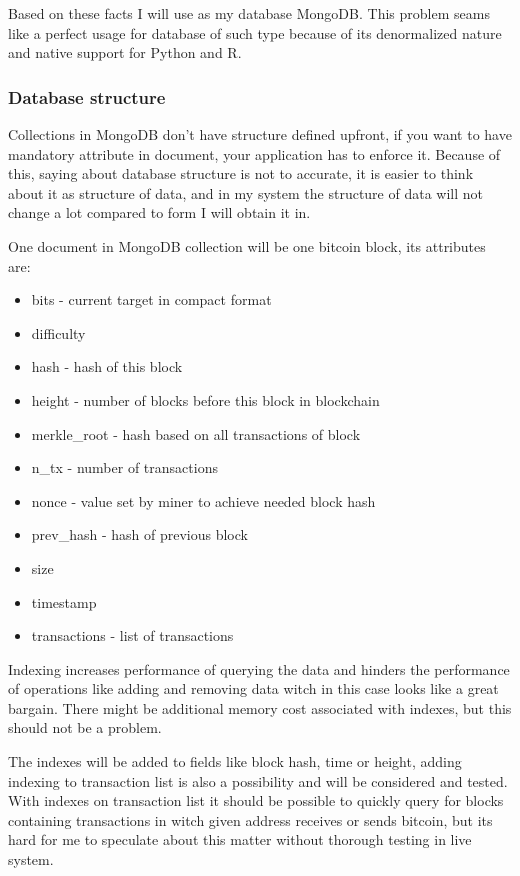 \documentclass[12pt, en, eng]{mgr}
\begin{document}
Based on these facts I will use as my database MongoDB. This problem seams like a perfect usage for database of such type because of its denormalized nature and native support for Python and R.


\subsubsection{Database structure}
 
Collections in MongoDB don't have structure defined upfront, if you want to have mandatory attribute in document, your application has to enforce it. Because of this, saying about database structure is not to accurate, it is easier to think about it as structure of data, and in my system the structure of data will not change a lot compared to form I will obtain it in. 

One document in MongoDB collection will be one bitcoin block, its attributes are:
\begin{itemize}
\item
bits - current target in compact format \cite{bitcoin-wiki-bha}
\item
difficulty
\item
hash - hash of this block
\item
height - number of blocks before this block in blockchain
\item
merkle\_root - hash based on all transactions of block
\item
n\_tx - number of transactions
\item
nonce - value set by miner to achieve needed block hash
\item
prev\_hash - hash of previous block
\item
size
\item
timestamp
\item
transactions - list of transactions
\end{itemize}

 
Indexing increases performance of querying the data and hinders the performance of operations like adding and removing data witch in this case looks like a great bargain. There might be additional memory cost associated with indexes, but this should not be a problem.

The indexes will be added to fields like block hash, time or height, adding indexing to transaction list is also a possibility and will be considered and tested. With indexes on transaction list it should be possible to quickly query for blocks containing transactions in witch given address receives or sends bitcoin, but its hard for me to speculate about this matter without thorough testing in live system.
\end{document}
